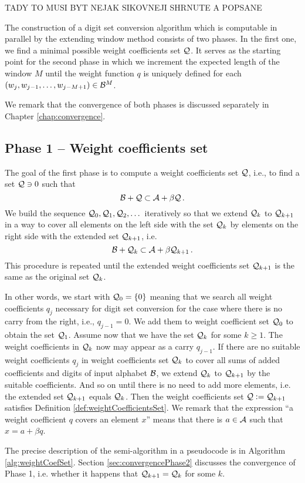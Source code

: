     TADY TO MUSI BYT NEJAK SIKOVNEJI SHRNUTE A POPSANE

The construction of a digit set conversion algorithm which is computable in parallel by the extending window method consists of two phases. In the first one, we find a minimal possible weight coefficients set $\mathcal{Q}$. It serves as the starting point for the second phase in which we increment the expected length of the window $M$ until the weight function $q$ is uniquely defined for each $(w_j,w_{j-1}, \dots , w_{j-M+1}) \in \mathcal{B}^{M}$.

We remark that the convergence of both phases is discussed separately in Chapter \ref{chap:convergence}.

\subsection{Phase 1 -- Weight coefficients set}
\label{subsec:phase1}
The goal of the first phase is to compute a weight coefficients set $\mathcal{Q}$, i.e., to find a set $\mathcal{Q} \ni 0$ such that 
$$
    \mathcal{B} + \mathcal{Q} \subset \mathcal{A} + \beta \mathcal{Q}\,.
$$  
We build the sequence $\mathcal{Q}_0, \mathcal{Q}_1, \mathcal{Q}_2,\dots$ iteratively so that we extend $\mathcal{Q}_k$ to $\mathcal{Q}_{k+1}$ in a way to cover all elements on the left side with the set $\mathcal{Q}_k$ by elements on the right side with the extended set $\mathcal{Q}_{k+1}$, i.e.
$$
\mathcal{B}+ \mathcal{Q}_k \subset \mathcal{A} + \beta \mathcal{Q}_{k+1}\,.
$$
This procedure is repeated until the extended weight coefficients set $\mathcal{Q}_{k+1}$ is the same as the original set $\mathcal{Q}_{k}$. 

In other words, we start with $\mathcal{Q}_0=\{0\}$ meaning that we search all weight coefficients $q_j$ necessary for digit set conversion for the case where there is no carry from the right, i.e., $q_{j-1}=0$. We add them to weight coefficient set $\mathcal{Q}_0$ to obtain the set $\mathcal{Q}_1$. Assume now that we have the set $\mathcal{Q}_k$ for some $k\geq 1$. The weight coefficients in $\mathcal{Q}_k$ now may appear as a carry $q_{j-1}$. If there are no suitable weight coefficients $q_j$ in weight coefficients set $\mathcal{Q}_k$ to cover all sums of added coefficients and digits of input alphabet $\mathcal{B}$, we extend $\mathcal{Q}_k$ to $\mathcal{Q}_{k+1}$ by the suitable coefficients. And so on until there is no need to add more elements, i.e. the extended set $\mathcal{Q}_{k+1}$ equals $\mathcal{Q}_k$. Then the weight coefficients set $\mathcal{Q}:=\mathcal{Q}_{k+1}$ satisfies Definition \ref{def:weightCoefficientsSet}. We remark that the expression ``a weight coefficient $q$ covers an element $x$'' means that there is $a \in \mathcal{A}$ such that $x=a + \beta q$.
    
The precise description of the semi-algorithm in a pseudocode is in Algorithm \ref{alg:weightCoefSet}.  Section \ref{sec:convergencePhase2} discusses the convergence of Phase 1, i.e. whether it happens that  $\mathcal{Q}_{k+1}=\mathcal{Q}_k$ for some  $k$.
    
